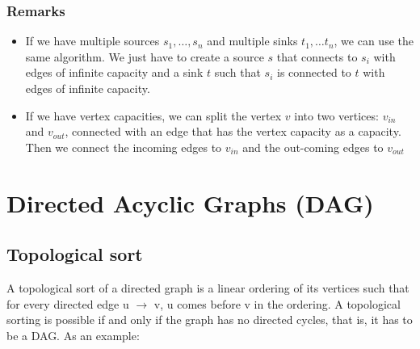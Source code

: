 \subsubsection{Remarks}
\begin{itemize}
	\item If we have multiple sources $s_1,\dots, s_n$ and multiple sinks 
		$t_1,\dots t_n$, we can use the same algorithm. We just have to create a 
		source $s$ that connects to $s_i$ with edges of infinite capacity and
		a sink $t$ such that $s_i$ is connected to $t$ with edges of infinite
		capacity.
		
	\item If we have vertex capacities, we can split the vertex $v$ into two 
			vertices: $v_{in}$ and $v_{out}$, connected with an edge that has 
			the vertex capacity as a capacity. 
			Then we connect the incoming edges to $v_{in}$ and the out-coming 
			edges to $v_{out}$


\end{itemize}
\section{Directed Acyclic Graphs (DAG)}
\subsection{Topological sort}
A topological sort of a directed graph is a linear ordering of its vertices
such that for every directed edge u $\rightarrow$ v, u comes before v in the
ordering.
A topological sorting is possible if and only if the graph has no directed
cycles, that is, it has to be a DAG. As an example:

